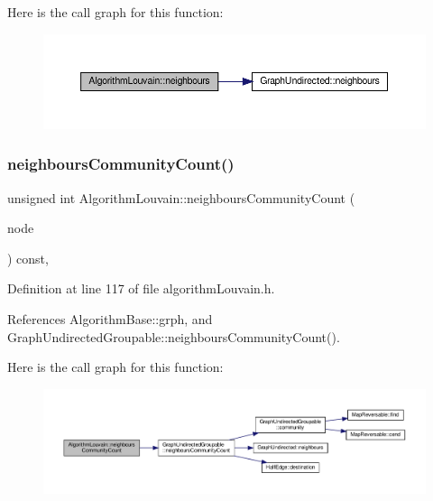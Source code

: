 Here is the call graph for this function\+:
\nopagebreak
\begin{figure}[H]
\begin{center}
\leavevmode
\includegraphics[width=350pt]{classAlgorithmLouvain_ab6206bfc3cf537277c6965bc0da6d695_cgraph}
\end{center}
\end{figure}
\mbox{\label{classAlgorithmLouvain_a1d8b2b22ab5f49b08141696712baf337}} 
\subsubsection{\texorpdfstring{neighbours\+Community\+Count()}{neighboursCommunityCount()}}
{\footnotesize\ttfamily unsigned int Algorithm\+Louvain\+::neighbours\+Community\+Count (\begin{DoxyParamCaption}\item[{const \hyperlink{edge_8h_a5fbd20c46956d479cb10afc9855223f6}{type\+Vertex} \&}]{node }\end{DoxyParamCaption}) const\hspace{0.3cm}{\ttfamily [inline]}, {\ttfamily [private]}}



Definition at line 117 of file algorithm\+Louvain.\+h.



References Algorithm\+Base\+::grph, and Graph\+Undirected\+Groupable\+::neighbours\+Community\+Count().

Here is the call graph for this function\+:
\nopagebreak
\begin{figure}[H]
\begin{center}
\leavevmode
\includegraphics[width=350pt]{classAlgorithmLouvain_a1d8b2b22ab5f49b08141696712baf337_cgraph}
\end{center}
\end{figure}
\mbox{\label{classAlgorithmLouvain_a4f1160234f469ddc9205e4d1217478ac}} 
